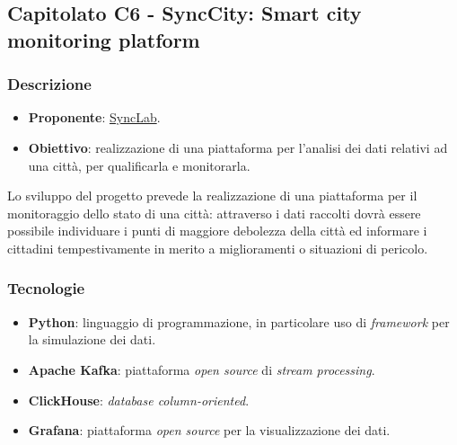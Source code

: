 \subsection{Capitolato C6 - SyncCity: Smart city monitoring platform}

\subsubsection{Descrizione}
\begin{itemize}
    \item \textbf{Proponente}: \href{https://www.synclab.it/home}{SyncLab}.
    \item \textbf{Obiettivo}: realizzazione di una piattaforma per l'analisi dei dati relativi ad una città, per qualificarla e monitorarla.
\end{itemize}
\noindent
Lo sviluppo del progetto prevede la realizzazione di una piattaforma per il monitoraggio dello stato di una città: attraverso i dati raccolti dovrà essere possibile individuare i punti di maggiore debolezza della città ed informare i cittadini tempestivamente in merito a miglioramenti o situazioni di pericolo.

\subsubsection{Tecnologie}
\begin{itemize}
    \item \textbf{Python}: linguaggio di programmazione, in particolare uso di \textit{framework} per la simulazione dei dati.
    \item \textbf{Apache Kafka}: piattaforma \textit{open source} di \textit{stream processing}.
    \item \textbf{ClickHouse}: \textit{database column-oriented}.
    \item \textbf{Grafana}: piattaforma \textit{open source} per la visualizzazione dei dati.
\end{itemize}


